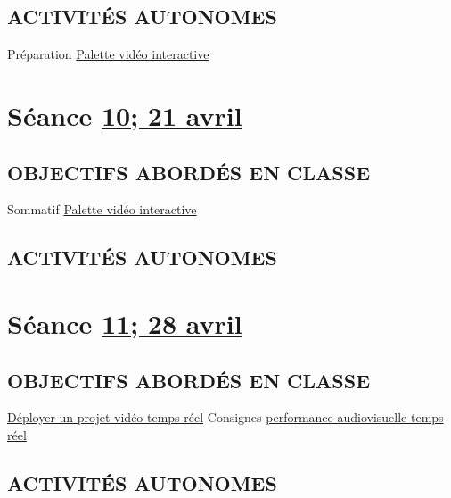 \documentclass[
  french,
]{book}
\begin{document}
\hypertarget{activituxe9s-autonomes-10}{%
\subsection{ACTIVITÉS AUTONOMES}\label{activituxe9s-autonomes-10}}

Préparation \protect\hyperlink{sommatif_4}{Palette vidéo interactive}

\hypertarget{semaine_12}{%
\section{\texorpdfstring{Séance \protect\hyperlink{semaine_12}{10; 21 avril}}{Séance 10; 21 avril}}\label{semaine_12}}

\hypertarget{objectifs-aborduxe9s-en-classe-11}{%
\subsection{OBJECTIFS ABORDÉS EN CLASSE}\label{objectifs-aborduxe9s-en-classe-11}}

Sommatif \protect\hyperlink{sommatif_4}{Palette vidéo interactive}

\hypertarget{activituxe9s-autonomes-11}{%
\subsection{ACTIVITÉS AUTONOMES}\label{activituxe9s-autonomes-11}}

\hypertarget{semaine_13}{%
\section{\texorpdfstring{Séance \protect\hyperlink{semaine_13}{11; 28 avril}}{Séance 11; 28 avril}}\label{semaine_13}}

\hypertarget{objectifs-aborduxe9s-en-classe-12}{%
\subsection{OBJECTIFS ABORDÉS EN CLASSE}\label{objectifs-aborduxe9s-en-classe-12}}

\protect\hyperlink{deployer}{Déployer un projet vidéo temps réel}
Consignes \protect\hyperlink{sommatif_5}{performance audiovisuelle temps réel}

\hypertarget{activituxe9s-autonomes-12}{%
\subsection{ACTIVITÉS AUTONOMES}\label{activituxe9s-autonomes-12}}
\end{document}
